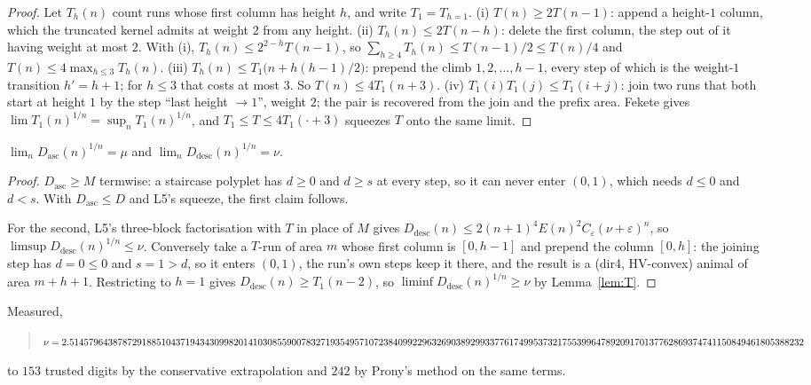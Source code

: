\documentclass[11pt]{article}
\begin{document}
\begin{proof}
Let $T_h(n)$ count runs whose first column has height $h$, and write
$T_1 = T_{h=1}$.
(i) $T(n) \ge 2T(n{-}1)$: append a height-$1$ column, which the truncated kernel
admits at weight $2$ from any height.
(ii) $T_h(n) \le 2T(n{-}h)$: delete the first column, the step out of it having
weight at most $2$. With (i), $T_h(n) \le 2^{2-h}T(n{-}1)$, so
$\sum_{h\ge4}T_h(n) \le T(n{-}1)/2 \le T(n)/4$ and
$T(n) \le 4\max_{h\le3}T_h(n)$.
(iii) $T_h(n) \le T_1\bigl(n + h(h{-}1)/2\bigr)$: prepend the climb
$1,2,\dots,h{-}1$, every step of which is the weight-$1$ transition $h' = h+1$;
for $h \le 3$ that costs at most $3$. So $T(n) \le 4T_1(n{+}3)$.
(iv) $T_1(i)T_1(j) \le T_1(i{+}j)$: join two runs that both start at height $1$
by the step ``last height $\to 1$'', weight $2$; the pair is recovered from the
join and the prefix area.
Fekete gives $\lim T_1(n)^{1/n} = \sup_n T_1(n)^{1/n}$, and
$T_1 \le T \le 4T_1(\cdot{+}3)$ squeezes $T$ onto the same limit.
\end{proof}

\begin{proposition}
\label{prop:split}
$\lim_n D_{\mathrm{asc}}(n)^{1/n} = \mu$ and
$\lim_n D_{\mathrm{desc}}(n)^{1/n} = \nu$.
\end{proposition}

\begin{proof}
$D_{\mathrm{asc}} \ge M$ termwise: a staircase polyplet has $d \ge 0$ and
$d \ge s$ at every step, so it can never enter $(0,1)$, which needs $d \le 0$
and $d < s$. With $D_{\mathrm{asc}} \le D$ and L5's squeeze, the first claim follows.

For the second, L5's three-block factorisation with $T$ in place of $M$
gives $D_{\mathrm{desc}}(n) \le 2(n{+}1)^4E(n)^2C_\varepsilon(\nu+\varepsilon)^n$,
so $\limsup D_{\mathrm{desc}}(n)^{1/n} \le \nu$. Conversely take a $T$-run of
area $m$ whose first column is $[0,h{-}1]$ and prepend the column $[0,h]$: the
joining step has $d = 0 \le 0$ and $s = 1 > d$, so it enters $(0,1)$, the run's
own steps keep it there, and the result is a (dir4, HV-convex) animal of area
$m + h + 1$. Restricting to $h = 1$ gives $D_{\mathrm{desc}}(n) \ge T_1(n{-}2)$,
so $\liminf D_{\mathrm{desc}}(n)^{1/n} \ge \nu$ by Lemma~\ref{lem:T}.
\end{proof}

Measured,
\begin{quote}\small
$\nu = 2.5145796438787291885104371943430998201410308559007832719354957107238\\
4099229632690389299337761749953732175539964789209170137762869374741150849461805388232$
\end{quote}
to $153$ trusted digits by the conservative extrapolation and $242$ by Prony's
method on the same terms.
\end{document}
